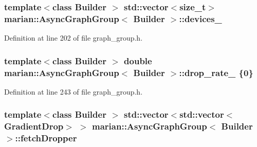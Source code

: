 \subsubsection[{\texorpdfstring{devices\+\_\+}{devices_}}]{\setlength{\rightskip}{0pt plus 5cm}template$<$class Builder $>$ std\+::vector$<$size\+\_\+t$>$ {\bf marian\+::\+Async\+Graph\+Group}$<$ Builder $>$\+::devices\+\_\+\hspace{0.3cm}{\ttfamily [private]}}\hypertarget{classmarian_1_1AsyncGraphGroup_a9fcc6fe896fe0c623a1cde656c6e123e}{}\label{classmarian_1_1AsyncGraphGroup_a9fcc6fe896fe0c623a1cde656c6e123e}


Definition at line 202 of file graph\+\_\+group.\+h.

\subsubsection[{\texorpdfstring{drop\+\_\+rate\+\_\+}{drop_rate_}}]{\setlength{\rightskip}{0pt plus 5cm}template$<$class Builder $>$ double {\bf marian\+::\+Async\+Graph\+Group}$<$ Builder $>$\+::drop\+\_\+rate\+\_\+ \{0\}\hspace{0.3cm}{\ttfamily [private]}}\hypertarget{classmarian_1_1AsyncGraphGroup_a774969ba69bab8fbd48e6454bbe7e54c}{}\label{classmarian_1_1AsyncGraphGroup_a774969ba69bab8fbd48e6454bbe7e54c}


Definition at line 243 of file graph\+\_\+group.\+h.

\subsubsection[{\texorpdfstring{fetch\+Dropper}{fetchDropper}}]{\setlength{\rightskip}{0pt plus 5cm}template$<$class Builder $>$ std\+::vector$<$std\+::vector$<${\bf Gradient\+Drop}$>$ $>$ {\bf marian\+::\+Async\+Graph\+Group}$<$ Builder $>$\+::fetch\+Dropper\hspace{0.3cm}{\ttfamily [private]}}\hypertarget{classmarian_1_1AsyncGraphGroup_a67f02023b00ba1a67e1f8894dbb7123a}{}\label{classmarian_1_1AsyncGraphGroup_a67f02023b00ba1a67e1f8894dbb7123a}


